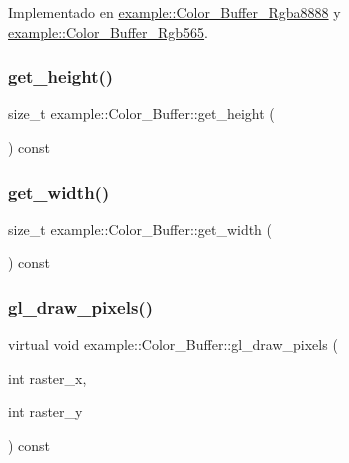 Implementado en \mbox{\hyperlink{classexample_1_1_color___buffer___rgba8888_ab2e7a20a9dd24c5dd422d143d9a2d391}{example\+::\+Color\+\_\+\+Buffer\+\_\+\+Rgba8888}} y \mbox{\hyperlink{classexample_1_1_color___buffer___rgb565_ad8125e1f708bd99aafce8ef7b713cc02}{example\+::\+Color\+\_\+\+Buffer\+\_\+\+Rgb565}}.

\mbox{\label{classexample_1_1_color___buffer_a4d1495a260205b83e1bd28dd04c6eda2}} 
\subsubsection{\texorpdfstring{get\_height()}{get\_height()}}
{\footnotesize\ttfamily size\+\_\+t example\+::\+Color\+\_\+\+Buffer\+::get\+\_\+height (\begin{DoxyParamCaption}{ }\end{DoxyParamCaption}) const\hspace{0.3cm}{\ttfamily [inline]}}

\mbox{\label{classexample_1_1_color___buffer_a0bbc4a120bc04b512e303baf8330ff82}} 
\subsubsection{\texorpdfstring{get\_width()}{get\_width()}}
{\footnotesize\ttfamily size\+\_\+t example\+::\+Color\+\_\+\+Buffer\+::get\+\_\+width (\begin{DoxyParamCaption}{ }\end{DoxyParamCaption}) const\hspace{0.3cm}{\ttfamily [inline]}}

\mbox{\label{classexample_1_1_color___buffer_a793b667028b2eb7efde2cee76066eac7}} 
\subsubsection{\texorpdfstring{gl\_draw\_pixels()}{gl\_draw\_pixels()}}
{\footnotesize\ttfamily virtual void example\+::\+Color\+\_\+\+Buffer\+::gl\+\_\+draw\+\_\+pixels (\begin{DoxyParamCaption}\item[{int}]{raster\+\_\+x,  }\item[{int}]{raster\+\_\+y }\end{DoxyParamCaption}) const\hspace{0.3cm}{\ttfamily [pure virtual]}}



